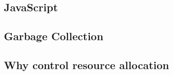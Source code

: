 \documentclass{l4proj}
\begin{document}
\subsection{JavaScript}
\subsection{Garbage Collection}



\subsection{Why control resource allocation}
\end{document}
